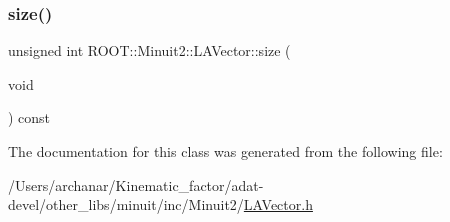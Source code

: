 \mbox{\label{classROOT_1_1Minuit2_1_1LAVector_a145e47ac78c4fcace3209ef477255937}} 
\subsubsection{\texorpdfstring{size()}{size()}\hspace{0.1cm}{\footnotesize\ttfamily [3/3]}}
{\footnotesize\ttfamily unsigned int R\+O\+O\+T\+::\+Minuit2\+::\+L\+A\+Vector\+::size (\begin{DoxyParamCaption}\item[{void}]{ }\end{DoxyParamCaption}) const\hspace{0.3cm}{\ttfamily [inline]}}



The documentation for this class was generated from the following file\+:\begin{DoxyCompactItemize}
\item 
/\+Users/archanar/\+Kinematic\+\_\+factor/adat-\/devel/other\+\_\+libs/minuit/inc/\+Minuit2/\mbox{\hyperlink{adat-devel_2other__libs_2minuit_2inc_2Minuit2_2LAVector_8h}{L\+A\+Vector.\+h}}\end{DoxyCompactItemize}
